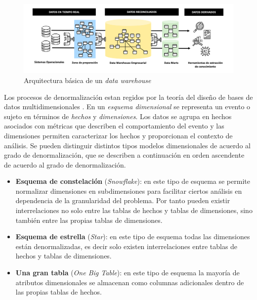     \begin{figure}[h!]
        \centering
        \includegraphics[width=\textwidth]{Images/dw-architecture.png}
        \caption{Arquitectura básica de un \textit{data warehouse}}
        \label{fig:dw-architecture}
    \end{figure}

    Los procesos de denormalización estan regidos por la teoría del diseño de bases de datos
    multidimensionales \cite{kimball2013data}. En un \textit{esquema dimensional} se representa
    un evento o sujeto en términos de \textit{hechos} y \textit{dimensiones}. 
    Los datos se agrupa en hechos asociados con métricas que describen el comportamiento del evento y
    las dimensiones permiten caracterizar los hechos y proporcionan el contexto de análisis. Se pueden distinguir
    distintos tipos modelos dimensionales de acuerdo al grado de denormalización, que se describen a continuación
    en orden ascendente de acuerdo al grado de denormalización.

    \begin{itemize}
        \item \textbf{Esquema de constelación} (\textit{Snowflake}): en este tipo de esquema se permite normalizar dimensiones en
        subdimensiones para facilitar ciertos análisis en dependencia de la granularidad del problema. Por tanto pueden
        existir interrelaciones no solo entre las tablas de hechos y tablas de dimensiones, sino también entre las propias tablas de dimensiones.
        \item \textbf{Esquema de estrella} (\textit{Star}): en este tipo de esquema todas las dimensiones están denormalizadas, es decir
        solo existen interrelaciones entre tablas de hechos y tablas de dimensiones. 
        \item \textbf{Una gran tabla} (\textit{One Big Table}): en este tipo de esquema la mayoría de atributos dimensionales
        se almacenan como columnas adicionales dentro de las propias tablas de hechos.
    \end{itemize}



